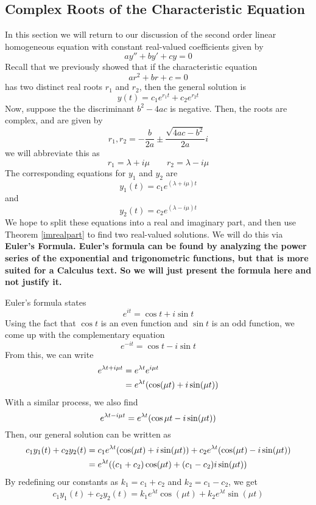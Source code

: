 \subsection{Complex Roots of the Characteristic Equation}
In this section we will return to our discussion of the second order linear homogeneous equation with constant real-valued coefficients given by
\[ ay'' + by' + cy = 0 \]
Recall that we previously showed that if the characteristic equation
\[ ar^2 + br + c = 0 \]
has two distinct real roots $r_1$ and $r_2$, then the general solution is
\[ y(t) = c_1 e^{r_1t} + c_2 e^{r_2 t} \]
Now, suppose the the discriminant $b^2-4ac$ is negative. Then, the roots are complex, and are given by
\[ r_1, r_2 = -\frac{b}{2a} \pm \frac{\sqrt{4ac-b^2}}{2a} i \]
we will abbreviate this as
\[ r_1 = \lambda + i\mu \quad \quad r_2 = \lambda - i\mu \]
The corresponding equations for $y_1$ and $y_2$ are
\[ y_1(t) = c_1 e^{(\lambda + i\mu)t} \]
and
\[ y_2(t) = c_2 e^{(\lambda - i\mu)t} \]
We hope to split these equations into a real and imaginary part, and then use Theorem \ref{imrealpart} to find two real-valued solutions. We will do this via \bf{Euler's Formula}. Euler's formula can be found by analyzing the power series of the exponential and trigonometric functions, but that is more suited for a Calculus text. So we will just present the formula here and not justify it. \par
Euler's formula states
\[ e^{it} = \cos t + i \sin t \]
Using the fact that $\cos t$ is an even function and $\sin t$ is an odd function, we come up with the complementary equation
\[ e^{-it} = \cos t - i \sin t \]
From this, we can write
\begin{align*} e^{\lambda t + i\mu t} &= e^{\lambda t}e^{i\mu t} \\
&= e^{\lambda t}\pqty{\cos (\mu t) + i\sin(\mu t)}
\end{align*}
With a similar process, we also find 
\[ e^{\lambda t - i\mu t} = e^{\lambda t}\pqty{\cos \mu t - i\sin(\mu t)} \]
Then, our general solution can be written as
\begin{align*}
    c_1y_1(t) + c_2y_2(t) &= c_1e^{\lambda t}\pqty{\cos (\mu t) + i\sin(\mu t)} + c_2e^{\lambda t}\pqty{\cos (\mu t) - i\sin(\mu t)} \\
    &= e^{\lambda t}\pqty{(c_1+c_2)\cos(\mu t) + (c_1 - c_2)i\sin(\mu t)} 
\end{align*}
By redefining our constants as $k_1 = c_1 + c_2$ and $k_2 = c_1 - c_2$, we get
\begin{align*}
    c_1y_1(t) + c_2y_2(t) = k_1e^{\lambda t}\cos (\mu t) + k_2 e^{\lambda t}\sin(\mu t)
\end{align*}
